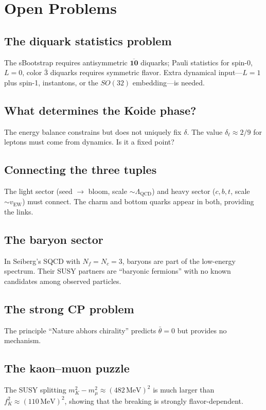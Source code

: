 \documentclass[12pt,a4paper]{article}
\newcommand{\MeV}{\,\text{MeV}}
\begin{document}
\section{Open Problems}
\label{sec:open}

\subsection{The diquark statistics problem}
The sBootstrap requires antisymmetric $\overline{\mathbf{10}}$ 
diquarks; Pauli statistics for spin-0, $L=0$, color $\bar{3}$ 
diquarks requires symmetric flavor. Extra dynamical input---$L=1$ 
plus spin-1, instantons, or the $SO(32)$ embedding---is needed.

\subsection{What determines the Koide phase?}
The energy balance constrains but does not uniquely fix $\delta$. 
The value $\delta_\ell \approx 2/9$ for leptons must come from 
dynamics. Is it a fixed point?

\subsection{Connecting the three tuples}
The light sector (seed $\to$ bloom, scale $\sim \Lambda_{\text{QCD}}$) 
and heavy sector ($c,b,t$, scale $\sim v_{\text{EW}}$) must connect. 
The charm and bottom quarks appear in both, providing the links.

\subsection{The baryon sector}
In Seiberg's SQCD with $N_f = N_c = 3$, baryons are part of the 
low-energy spectrum. Their SUSY partners are ``baryonic fermions'' 
with no known candidates among observed particles.

\subsection{The strong CP problem}
The principle ``Nature abhors chirality'' predicts $\bar{\theta} = 0$ 
but provides no mechanism.

\subsection{The kaon--muon puzzle}
The SUSY splitting $m_K^2 - m_\mu^2 \approx (482\MeV)^2$ is much 
larger than $f_K^2 \approx (110\MeV)^2$, showing that the breaking 
is strongly flavor-dependent.
\end{document}
